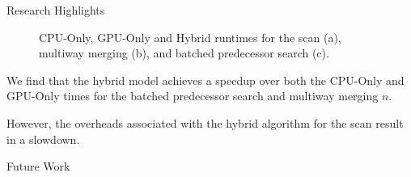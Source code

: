 \documentclass[final]{beamer}
\newlength{\colwidth}
\begin{document}
\begin{frame}[t]
\begin{columns}[t]
\begin{column}{\colwidth}
\begin{block}{Research Highlights}
 \begin{figure}[htp]
\centering
{}
   \caption{CPU-Only, GPU-Only and Hybrid runtimes for the scan (a), multiway merging (b), and batched predecessor search (c).}
   \label{fig:predecessor_search_results}
\end{figure}

\end{block} 
\begin{description}[font=$\bullet$~\normalfont\scshape\color{red!50!black}]
\item We find that the hybrid model achieves a speedup over both the CPU-Only and GPU-Only times for the batched predecessor search and multiway merging $n$. 
\item However, the overheads associated with the hybrid algorithm for the scan result in a slowdown.
\end{description}


\begin{block}{Future Work}


\end{block}
\end{column}
\end{columns}
\end{frame}
\end{document}

